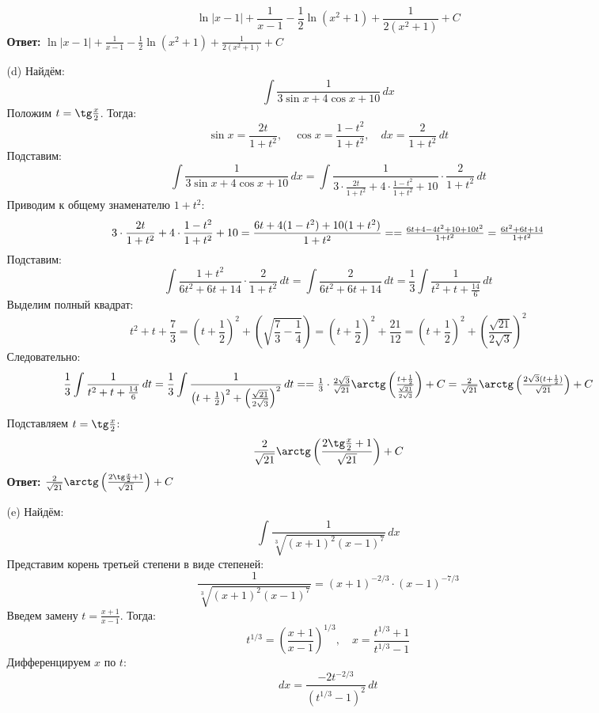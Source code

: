 \documentclass[a4paper]{article}
\begin{document}
\begin{enumerate}
\begin{enumerate}
   \[
   \ln|x - 1| + \frac{1}{x - 1} - \frac{1}{2} \ln(x^2 + 1) + \frac{1}{2(x^2 + 1)} + C
   \]  
   \textbf{Ответ:} $\ln|x - 1| + \frac{1}{x - 1} - \frac{1}{2} \ln(x^2 + 1) + \frac{1}{2(x^2 + 1)} + C$\\

   \item[(d)]Найдём:
   $$\int \frac{1}{3\sin x + 4\cos x + 10} \, dx$$
   Положим \( t = \tg\frac{x}{2} \). Тогда:  
   \[
   \sin x = \frac{2t}{1 + t^2}, \quad \cos x = \frac{1 - t^2}{1 + t^2}, \quad dx = \frac{2}{1 + t^2} \, dt
   \]
   Подставим:
   \[
    \int \frac{1}{3\sin x + 4\cos x + 10} \, dx = \int \frac{1}{3 \cdot \frac{2t}{1 + t^2} + 4 \cdot \frac{1 - t^2}{1 + t^2} + 10} \cdot \frac{2}{1 + t^2} \, dt
   \]
   Приводим к общему знаменателю \( 1 + t^2 \):  
   \[
    3 \cdot \frac{2t}{1 + t^2} + 4 \cdot \frac{1 - t^2}{1 + t^2} + 10 = \frac{6t + 4(1 - t^2) + 10(1 + t^2)}{1 + t^2} =$$
    $$= \frac{6t + 4 - 4t^2 + 10 + 10t^2}{1 + t^2} = \frac{6t^2 + 6t + 14}{1 + t^2}
   \]
   Подставим:
   \[
   \int \frac{1 + t^2}{6t^2 + 6t + 14} \cdot \frac{2}{1 + t^2} \, dt = \int \frac{2}{6t^2 + 6t + 14} \, dt = \frac{1}{3} \int \frac{1}{t^2 + t + \frac{14}{6}} \, dt
   \]
   Выделим полный квадрат:
   \[
   t^2 + t + \frac{7}{3} = \left(t + \frac{1}{2}\right)^2 + \left(\sqrt{\frac{7}{3} - \frac{1}{4}}\right) = \left(t + \frac{1}{2}\right)^2 + \frac{21}{12} = \left(t + \frac{1}{2}\right)^2 + \left(\frac{\sqrt{21}}{2\sqrt{3}}\right)^2
   \]
   Следовательно:
   \[
    \frac{1}{3} \int \frac{1}{t^2 + t + \frac{14}{6}} \, dt = \frac{1}{3} \int \frac{1}{\left(t + \frac{1}{2}\right)^2 + \left(\frac{\sqrt{21}}{2\sqrt{3}}\right)^2} \, dt = $$
    $$=\frac{1}{3} \cdot \frac{2\sqrt{3}}{\sqrt{21}} \arctg\left( \frac{t + \frac{1}{2}}{\frac{\sqrt{21}}{2\sqrt{3}}} \right) + C = \frac{2}{\sqrt{21}} \arctg\left( \frac{2\sqrt{3}(t + \frac{1}{2})}{\sqrt{21}} \right) + C
   \]
   Подставляем \( t = \tg\frac{x}{2} \):  
   \[
   \frac{2}{\sqrt{21}} \arctg\left( \frac{2\tg\frac{x}{2} + 1}{\sqrt{21}} \right) + C
   \]
   \textbf{Ответ:} $\frac{2}{\sqrt{21}} \arctg\left( \frac{2\tg\frac{x}{2} + 1}{\sqrt{21}} \right) + C$\\

   \item[(e)]Найдём:
   $$\int \frac{1}{\sqrt[3]{(x+1)^2(x-1)^7}} \, dx$$
   Представим корень третьей степени в виде степеней:  
   \[
   \frac{1}{\sqrt[3]{(x+1)^2(x-1)^7}} = (x+1)^{-2/3} \cdot (x-1)^{-7/3}
   \]
   Введем замену \( t = \frac{x+1}{x-1} \). Тогда:  
   \[
   t^{1/3} = \left( \frac{x+1}{x-1} \right)^{1/3}, \quad x = \frac{t^{1/3} + 1}{t^{1/3} - 1}
   \]  
   Дифференцируем \( x \) по \( t \):  
   \[
   dx = \frac{-2t^{-2/3}}{(t^{1/3} - 1)^2} \, dt
   \]

\end{enumerate}


\end{enumerate}
\end{document}
